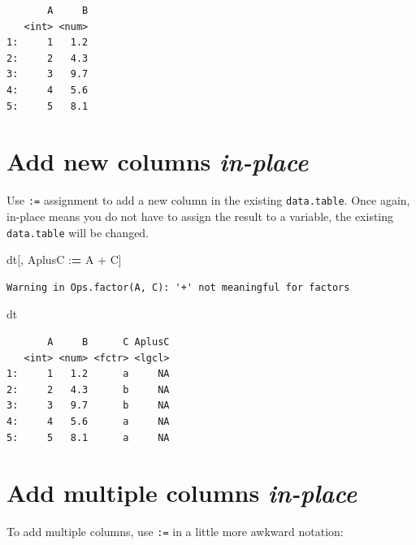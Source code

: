 \documentclass[
]{book}
\newenvironment{Shaded}{\begin{snugshade}}{\end{snugshade}}
\newcommand{\ErrorTok}[1]{\textcolor[rgb]{0.64,0.00,0.00}{\textbf{#1}}}
\newcommand{\NormalTok}[1]{#1}
\newcommand{\SpecialCharTok}[1]{\textcolor[rgb]{0.00,0.00,0.00}{#1}}
\begin{document}
\begin{verbatim}
       A     B
   <int> <num>
1:     1   1.2
2:     2   4.3
3:     3   9.7
4:     4   5.6
5:     5   8.1
\end{verbatim}

\hypertarget{add-new-columns-in-place}{%
\section{\texorpdfstring{Add new columns \textbf{\emph{in-place}}}{Add new columns in-place}}\label{add-new-columns-in-place}}

Use \texttt{:=} assignment to add a new column in the existing \texttt{data.table}.
Once again, in-place means you do not have to assign the result to a variable, the existing \texttt{data.table} will be changed.

\begin{Shaded}
\begin{Highlighting}[]
\NormalTok{dt[, AplusC }\SpecialCharTok{:}\ErrorTok{=}\NormalTok{ A }\SpecialCharTok{+}\NormalTok{ C]}
\end{Highlighting}
\end{Shaded}

\begin{verbatim}
Warning in Ops.factor(A, C): '+' not meaningful for factors
\end{verbatim}

\begin{Shaded}
\begin{Highlighting}[]
\NormalTok{dt}
\end{Highlighting}
\end{Shaded}

\begin{verbatim}
       A     B      C AplusC
   <int> <num> <fctr> <lgcl>
1:     1   1.2      a     NA
2:     2   4.3      b     NA
3:     3   9.7      b     NA
4:     4   5.6      a     NA
5:     5   8.1      a     NA
\end{verbatim}

\hypertarget{add-multiple-columns-in-place}{%
\section{\texorpdfstring{Add multiple columns \textbf{\emph{in-place}}}{Add multiple columns in-place}}\label{add-multiple-columns-in-place}}

To add multiple columns, use \texttt{:=} in a little more awkward notation:
\end{document}
